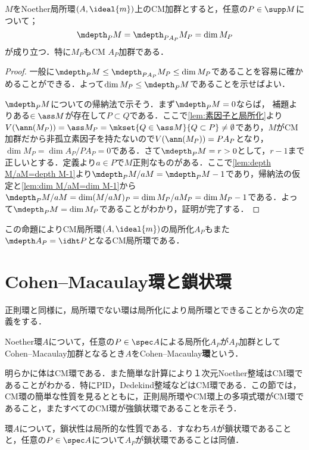 \begin{prop}\label{prop:CMの局所化もCM}
	$M$をNoether局所環$(A,\ideal{m})$上のCM加群とすると，任意の$P\in\supp M$について；
	\[\mdepth_P M=\mdepth_{PA_P} M_P=\dim M_P\]
	が成り立つ．特に$M_P$もCM $A_P$加群である．
\end{prop}

\begin{proof}
	一般に$\mdepth_P M\leq\mdepth_{PA_P}M_P\leq\dim M_P$であることを容易に確かめることができる．よって$\dim M_P\leq\mdepth_P M$であることを示せばよい．
	
	$\mdepth_P M$についての帰納法で示そう．まず$\mdepth_P M=0$ならば，
	補題よりある$\in\ass M$が存在して$P\subset Q$である．ここで\ref{lem:素因子と局所化}より$V(\ann (M_P))=\ass M_P=\mkset{Q\in\ass M}{Q\subset P}\neq\emptyset$であり，$M$がCM加群だから非孤立素因子を持たないので$V(\ann(M_P))=PA_P$となり，$\dim M_P=\dim A_P/PA_P=0$である．さて$\mdepth_P M=r>0$として，$r-1$まで正しいとする．定義より$a\in P$で$M$正則なものがある．ここで\ref{lem:depth M/aM=depth M-1}より$\mdepth_P M/aM=\mdepth_P M-1$であり，帰納法の仮定と\ref{lem:dim M/aM=dim M-1}から$\mdepth_P M/aM=\dim (M/aM)_P=\dim M_P/aM_P=\dim M_P-1$である．よって$\mdepth_P M=\dim M_P$であることがわかり，証明が完了する．	
\end{proof}

この命題によりCM局所環$(A,\ideal{m})$の局所化$A_P$もまた$\mdepth A_P=\idht P$となるCM局所環である．
\section{Cohen--Macaulay環と鎖状環}

正則環と同様に，局所環でない環は局所化により局所環とできることから次の定義をする．
\begin{defi}
	Noether環$A$について，任意の$P\in\spec A$による局所化$A_P$が$A_P$加群としてCohen--Macaulay加群となるとき$A$をCohen--Macaulay\textbf{環}という．
\end{defi}

明らかに体はCM環である．また簡単な計算により１次元Noether整域はCM環であることがわかる．特にPID，Dedekind整域などはCM環である．この節では，CM環の簡単な性質を見るとともに，正則局所環やCM環上の多項式環がCM環であること，またすべてのCM環が強鎖状環であることを示そう．

\begin{prop}
	環$A$について，鎖状性は局所的な性質である．すなわち$A$が鎖状環であることと，任意の$P\in\spec A$について$A_P$が鎖状環であることは同値．
\end{prop}

